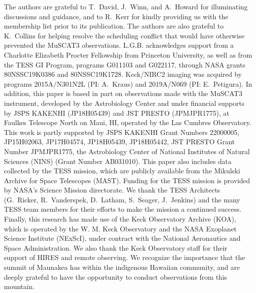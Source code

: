 \documentclass[12pt,modern,twocolumn,tighten]{aastex63}
\begin{document}
The authors are grateful to T{.}~David, J{.}~Winn, and A{.}~Howard for
illuminating discussions and guidance, and to R{.}~Kerr for kindly
providing us with the \citet{Kerr2021} membership list prior to its
publication.
The authors are also grateful to K{.}~Collins for
helping resolve the scheduling conflict that would have otherwise
prevented the MuSCAT3 observations.
%
L.G.B{.} acknowledges support from a Charlotte Elizabeth Procter
Fellowship from Princeton University, as well as from the TESS GI Program, programs
G011103 and G022117, through NASA grants 80NSSC19K0386 and
80NSSC19K1728.
%
%
Keck/NIRC2 imaging was acquired by programs 2015A/N301N2L
(PI: A.~Kraus) and 2019A/N069 (PI: E.~Petigura).
%
In addition, this paper is based in part on observations made with the
MuSCAT3 instrument, developed by the Astrobiology Center and under
financial supports by JSPS KAKENHI (JP18H05439) and JST PRESTO
(JPMJPR1775), at Faulkes Telescope North on Maui, HI, operated by the
Las Cumbres Observatory.
%
This work is partly supported by JSPS KAKENHI Grant Numbers 22000005,
JP15H02063, JP17H04574, JP18H05439, JP18H05442, JST PRESTO Grant
Number JPMJPR1775, the Astrobiology Center of National Institutes of
Natural Sciences (NINS) (Grant Number AB031010).
%
%
This paper also includes data collected by the TESS mission, which are
publicly available from the Mikulski Archive for Space Telescopes
(MAST).
%
Funding for the TESS mission is provided by NASA's Science Mission
directorate.
%
We thank the TESS Architects (G.~Ricker, R.~Vanderspek, D.~Latham,
S.~Seager, J.~Jenkins) and the many TESS team members for their
efforts to make the mission a continued success.
%
%
%
%
Finally, this research has made use of the Keck Observatory Archive (KOA),
which is operated by the W. M. Keck Observatory and the NASA Exoplanet
Science Institute (NExScI), under contract with the National
Aeronautics and Space Administration.  We also thank the Keck
Observatory staff for their support of HIRES and remote observing.  We
recognize the importance that the summit of Maunakea has within the
indigenous Hawaiian community, and are deeply grateful to have the
opportunity to conduct observations from this mountain.
%
%
\end{document}
